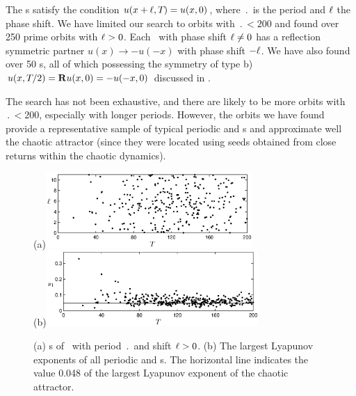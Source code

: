 

The \rpo s satisfy the condition  $u(x+\ell,{T_{}}) = u(x,0)$,
where $\period{}$ is the period and $\ell$ the phase shift.
We have limited our search to orbits with $\period{} < 200$ and found
over 250 prime orbits with $\ell > 0$.  Each \rpo\ with phase shift
$\ell \neq 0$ has a reflection symmetric partner
$u(x) \to -u(-x)$ with phase shift $-\ell$.  We have also found over
50 \po s, all of which possessing the symmetry of type b) $u(x,{T_{}}/2) =
{\bf R} u(x,0) = -u(-x,0)$ discussed in .

The search has not been exhaustive, and there are likely to be more
orbits with $\period{} < 200$, especially with longer periods.
However, the orbits we have found provide a representative sample of
typical periodic and \rpo s and approximate well the chaotic
attractor (since they were located using seeds obtained from close
returns within the chaotic dynamics).

\begin{figure}[t]
\begin{center}
(a)\hspace{1ex}\includegraphics[width=0.7\textwidth]{figs/ks22_rpos_Tdelta.eps}\\
(b)\includegraphics[width=0.72\textwidth]{figs/ks22_rpos_lyap.eps}
\end{center}
\caption{
(a) \Rpo s of \KSe\ with period $\period{}$ and shift $\ell > 0$.
(b) The largest Lyapunov exponents  of all periodic
and \rpo s.  The horizontal line indicates the value 0.048 of the largest 
Lyapunov exponent of the chaotic attractor.
} \label{f:ks22rposT}
\end{figure}

